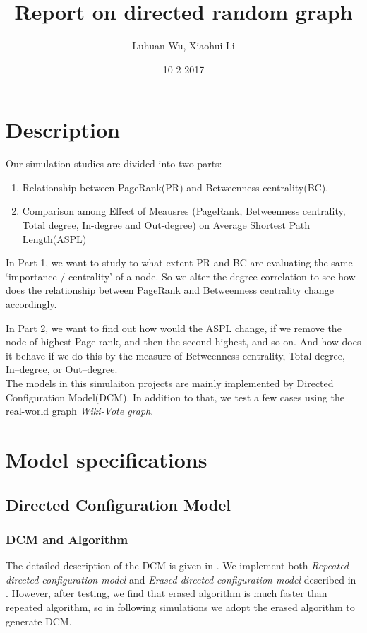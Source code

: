 \documentclass{article}
\title{Report on directed random graph}
\author{\vspace{-6ex} Luhuan Wu, Xiaohui Li}
\date{10-2-2017}
\begin{document}
\maketitle

\section{Description}
Our simulation studies are divided into two parts:
\begin{enumerate}
\item Relationship between PageRank(PR) and Betweenness centrality(BC).
\item Comparison among Effect of Meausres (PageRank, Betweenness centrality, Total degree, In-degree and Out-degree) on Average Shortest Path Length(ASPL)
\end{enumerate}
\par In Part 1, we want to study to what extent PR and BC are evaluating the same `importance / centrality' of a node. So we alter the degree correlation to see how does the relationship between PageRank and Betweenness centrality change accordingly.
\par In Part 2, we want to find out how would the ASPL change, if we remove the node of highest Page rank, and then the second highest, and so on. And how does it behave if we do this by the measure of Betweenness centrality,  Total degree,  In--degree, or Out--degree.  \\

The models in this simulaiton projects are mainly implemented by Directed Configuration Model(DCM). In addition to that, we test a few cases using the real-world graph \emph{Wiki-Vote graph}.\\

\section{Model specifications}
	\subsection{Directed Configuration Model}
		
		\subsubsection{DCM and Algorithm} 
\par The detailed description of the DCM is given in \cite{algo}. We implement both \emph{Repeated directed configuration model} and \emph{Erased directed configuration model} described in \cite{algo}. However, after testing, we find that erased algorithm is much faster than repeated algorithm, so in following simulations we adopt the erased algorithm to generate DCM.
\end{document}
